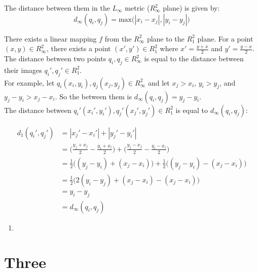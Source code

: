 \documentclass [12pt]{article}
\begin{document}
    The distance between them in the $L_\infty$ metric ($R^2_\infty$ plane) is given by: $$ d_{\infty}(q_i, q_j) = \text{max}\Big( |x_i - x_j|, |y_i - y_j| \Big)  $$


    There exists a linear mapping $f$ from the $R^2_\infty$ plane to the $R^2_1$ plane. For a point $(x, y) \in R^2_\infty$, there exists a point $(x', y') \in R^2_1$ where $x' = \frac{y + x}{2}$ and $y' = \frac{y - x}{2}$. The distance between two points $q_i, q_j \in R^2_\infty$ is equal to the distance between their images $q_i', q_j' \in R^2_1$. \\

    For example, let $q_i(x_i, y_i), q_j(x_j, y_j) \in R^2_\infty$ and let $x_j > x_i$, $y_i > y_j$, and $y_j - y_i > x_j - x_i$. So the between them is $d_{\infty}(q_i, q_j) =  y_j - y_i $.\\ 

    The distance between $q_i'(x_i', y_i'), q_j'(x_j', y_j') \in R^2_1$ is equal to $d_{\infty}(q_i, q_j)$: 

    \begin{align*}
        d_{1}(q_i', q_j')   &= |x_j' - x_i'| + |y_j' - y_i'| \\ 
                            &= \Big( \frac{y_j + x_j}{2} - \frac{y_i + x_i}{2} \Big) + \Big( \frac{y_j - x_j}{2} - \frac{y_i - x_i}{2} \Big) \\ 
                            &= \frac{1}{2} \Big( (y_j - y_i) + (x_j - x_i) \Big) + \frac{1}{2} \Big( (y_j - y_i) - (x_j - x_i) \Big)\\ 
                            &= \frac{1}{2} \Big( 2(y_i - y_j) + (x_j - x_i) - (x_j - x_i) \Big) \\
                            &= y_i - y_j \\ 
                            &= d_{\infty}(q_i, q_j)
    \end{align*}




    \begin{enumerate}[label=\alph*.]
        \item 

    \end{enumerate}

        



    \section{Three}
    \label{sec:three}
\end{document}
